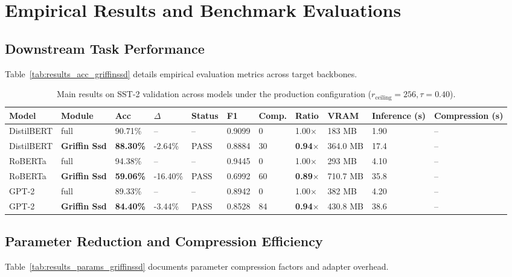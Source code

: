 \section{Empirical Results and Benchmark Evaluations}

\subsection{Downstream Task Performance}
Table~\ref{tab:results_acc_griffinssd} details empirical evaluation metrics across target backbones.

\begin{table}[t]
\centering
\small
\begin{tabular}{lllllllllll}
\toprule
\textbf{Model} & \textbf{Module} & \textbf{Acc} & \textbf{$\Delta$} & \textbf{Status} & \textbf{F1} & \textbf{Comp.} & \textbf{Ratio} & \textbf{VRAM} & \textbf{Inference (s)} & \textbf{Compression (s)} \\
\midrule
DistilBERT & full & 90.71\% & -- & -- & 0.9099 & 0 & 1.00$\times$ & 183 MB & 1.90 & -- \\
DistilBERT & \textbf{Griffin Ssd} & \textbf{88.30\%} & -2.64\% & PASS & 0.8884 & 30 & \textbf{0.94$\times$} & 364.0 MB & 17.4 & -- \\
RoBERTa & full & 94.38\% & -- & -- & 0.9445 & 0 & 1.00$\times$ & 293 MB & 4.10 & -- \\
RoBERTa & \textbf{Griffin Ssd} & \textbf{59.06\%} & -16.40\% & PASS & 0.6992 & 60 & \textbf{0.89$\times$} & 710.7 MB & 35.8 & -- \\
GPT-2 & full & 89.33\% & -- & -- & 0.8942 & 0 & 1.00$\times$ & 382 MB & 4.20 & -- \\
GPT-2 & \textbf{Griffin Ssd} & \textbf{84.40\%} & -3.44\% & PASS & 0.8528 & 84 & \textbf{0.94$\times$} & 430.8 MB & 38.6 & -- \\
\bottomrule
\end{tabular}
\caption{Main results on SST-2 validation across models under the production configuration ($r_{\mathrm{ceiling}}=256, \tau=0.40$).}
\label{tab:main_sst2}
\end{table}

\subsection{Parameter Reduction and Compression Efficiency}
Table~\ref{tab:results_params_griffinssd} documents parameter compression factors and adapter overhead.

